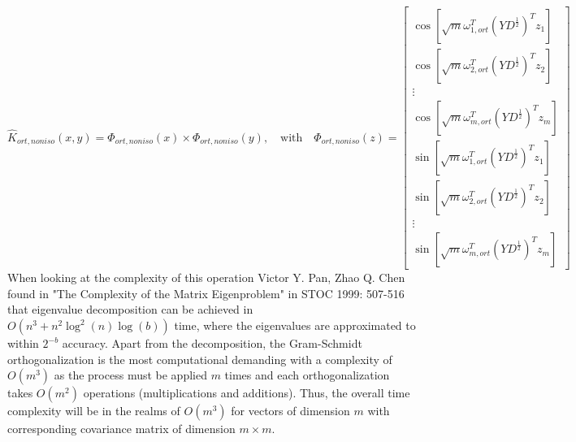 \documentclass[11pt]{article}
\begin{document}
\begin{equation*}
\hat{K}_{ort, noniso}(x,y) = \Phi_{ort, noniso}(x) \times \Phi_{ort, noniso}(y), \quad \text{with} \quad \Phi_{ort, noniso}(z) = 
\begin{bmatrix}
	
          \cos[\sqrt{m}\omega_{1,ort}^T(YD^{\frac{1}{2}})^Tz_1] \\
          \cos[\sqrt{m}\omega_{2,ort}^T(YD^{\frac{1}{2}})^Tz_2] \\
          \vdots \\
           \cos[\sqrt{m}\omega_{m,ort}^T(YD^{\frac{1}{2}})^Tz_m] \\
          \sin[\sqrt{m}\omega_{1,ort}^T(YD^{\frac{1}{2}})^Tz_1] \\
          \sin[\sqrt{m}\omega_{2,ort}^T(YD^{\frac{1}{2}})^Tz_2] \\
          \vdots \\
          \sin[\sqrt{m}\omega_{m,ort}^T(YD^{\frac{1}{2}})^Tz_m] 
         \end{bmatrix}
\end {equation*}
When looking at the complexity of this operation Victor Y. Pan, Zhao Q. Chen found in "The Complexity of the Matrix Eigenproblem" in STOC 1999: 507-516 that eigenvalue decomposition can be achieved in $O(n^3+n^2\log^2(n)\log(b))$ time, where the eigenvalues are approximated to within $2^{-b}$ accuracy. Apart from the decomposition, the Gram-Schmidt orthogonalization is the most computational demanding with a complexity of $O(m^3)$ as the process must be applied $m$ times and each orthogonalization takes $O(m^2)$ operations (multiplications and additions). Thus, the overall time complexity will be in the realms of $O(m^3)$ for vectors of dimension $m$ with corresponding covariance matrix of dimension $m \times m$.
\end{document}
